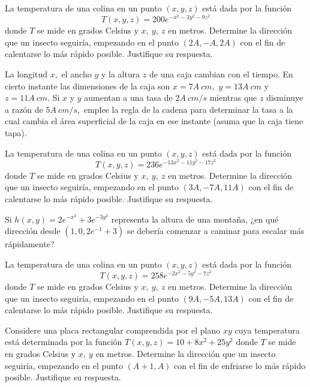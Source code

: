 \begin{prob}
La temperatura de una colina en un punto $(x,y,z)$ está dada por la función $$T(x,y,z)=200e^{-x^2-3y^2-9z^2}$$ donde $T$ se mide en grados Celsius y $x,\ y, \ z$ en metros.  Determine la dirección que un insecto seguiría, empezando en el punto $(2A,-A,2A)$ con el fin de calentarse lo más rápido posible. Justifique su respuesta.
\end{prob}

\begin{prob}
La longitud $x,$ el ancho $y$ y la altura $z$ de una caja cambian con el tiempo. En cierto instante las dimensiones de la caja son $x=7A\ cm,$ $y=13A\ cm$ y $z= 11A\ cm.$ Si $x$ y $y$ aumentan a una tasa de $2A\ cm/s$ mientras que $z$ disminuye a razón de $5A\ cm/s,$ emplee la regla de la cadena para determinar la tasa a la cual cambia el área superficial de la caja en ese instante (asuma que la caja tiene tapa).
\end{prob}


\begin{prob}
La temperatura de una colina en un punto $(x,y,z)$ está dada por la función $$T(x,y,z)=236e^{-13x^2-11y^2-17z^2}$$ donde $T$ se mide en grados Celsius y $x,\ y, \ z$ en metros.  Determine la dirección que un insecto seguiría, empezando en el punto $(3A,-7A,11A)$ con el fin de calentarse lo más rápido posible. Justifique su respuesta.
\end{prob}


\begin{prob}
Si $h(x,y)=2e^{-x^2}+3e^{-3y^2}$ representa la altura de una montaña, ¿en qué dirección desde $(1,0,2e^{-1}+3)$ se debería comenzar a caminar para escalar más rápidamente?
\end{prob}

\begin{prob}
La temperatura de una colina en un punto $(x,y,z)$ está dada por la función $$T(x,y,z)=258e^{-2x^2-5y^2-7z^2}$$ donde $T$ se mide en grados Celsius y $x,\ y, \ z$ en metros.  Determine la dirección que un insecto seguiría, empezando en el punto $(9A,-5A,13A)$ con el fin de calentarse lo más rápido posible. Justifique su respuesta.
\end{prob}

\begin{prob}
Considere una placa rectangular comprendida por el plano $xy$ cuya temperatura está determinada por  la función $T(x,y,z)=10+8x^2+25y^2$ donde $T$ se mide en grados Celsius y $x,\ y$ en metros.  Determine la dirección que un insecto seguiría, empezando en el punto $(A+1,A)$ con el fin de enfriarse lo más rápido posible. Justifique su respuesta.
\end{prob}


